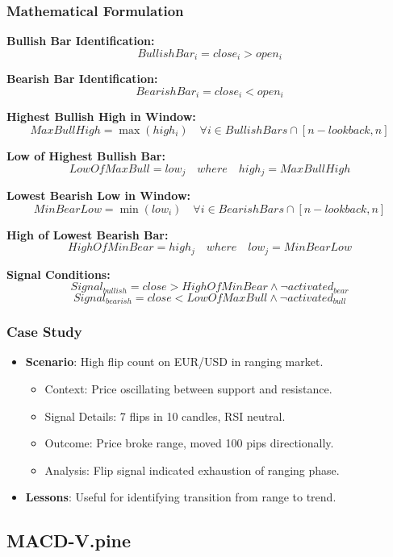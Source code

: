 \documentclass[12pt]{article}
\begin{document}
\subsubsection{Mathematical Formulation}
\textbf{Bullish Bar Identification:}
\[
BullishBar_i = close_i > open_i
\]

\textbf{Bearish Bar Identification:}
\[
BearishBar_i = close_i < open_i
\]

\textbf{Highest Bullish High in Window:}
\[
MaxBullHigh = \max(high_i) \quad \forall i \in BullishBars \cap [n-lookback, n]
\]

\textbf{Low of Highest Bullish Bar:}
\[
LowOfMaxBull = low_j \quad where \quad high_j = MaxBullHigh
\]

\textbf{Lowest Bearish Low in Window:}
\[
MinBearLow = \min(low_i) \quad \forall i \in BearishBars \cap [n-lookback, n]
\]

\textbf{High of Lowest Bearish Bar:}
\[
HighOfMinBear = high_j \quad where \quad low_j = MinBearLow
\]

\textbf{Signal Conditions:}
\[
Signal_{bullish} = close > HighOfMinBear \land \neg activated_{bear}
\]
\[
Signal_{bearish} = close < LowOfMaxBull \land \neg activated_{bull}
\]

\subsubsection{Case Study}
\begin{itemize}
\item \textbf{Scenario}: High flip count on EUR/USD in ranging market.
  \begin{itemize}
  \item Context: Price oscillating between support and resistance.
  \item Signal Details: 7 flips in 10 candles, RSI neutral.
  \item Outcome: Price broke range, moved 100 pips directionally.
  \item Analysis: Flip signal indicated exhaustion of ranging phase.
  \end{itemize}
\item \textbf{Lessons}: Useful for identifying transition from range to trend.
\end{itemize}

\subsection{MACD-V.pine}
\label{subsec:macdv}
\end{document}
